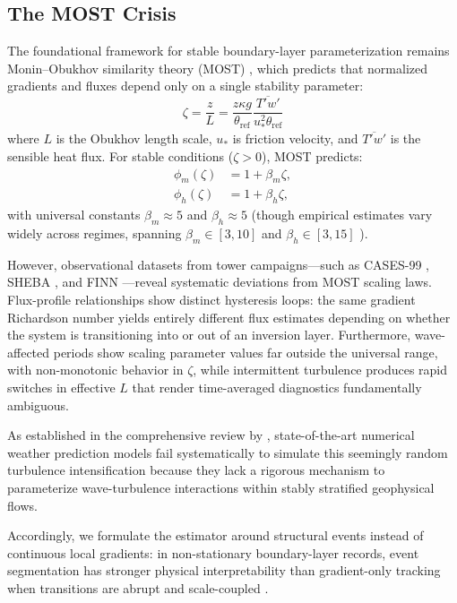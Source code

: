 \subsection{The MOST Crisis}

The foundational framework for stable boundary-layer parameterization remains Monin--Obukhov similarity theory (MOST) \citep{Obukhov1946, Paulson1970}, which predicts that normalized gradients and fluxes depend only on a single stability parameter:
\begin{equation}
\zeta = \frac{z}{L} = \frac{z \kappa g}{\theta_{\mathrm{ref}}} \frac{\overline{T'w'}}{u_*^2 \theta_{\mathrm{ref}}}
\label{eq:zeta}
\end{equation}
where $L$ is the Obukhov length scale, $u_*$ is friction velocity, and $\overline{T'w'}$ is the sensible heat flux. For stable conditions ($\zeta > 0$), MOST predicts:
\begin{equation}
\begin{aligned}
\phi_m(\zeta) &= 1 + \beta_m\zeta, \\
\phi_h(\zeta) &= 1 + \beta_h\zeta,
\end{aligned}
\end{equation}
with universal constants $\beta_m \approx 5$ and $\beta_h \approx 5$ (though empirical estimates vary widely across regimes, spanning $\beta_m \in [3, 10]$ and $\beta_h \in [3, 15]$ \citep{Dyer1974, Högström1988}).

However, observational datasets from tower campaigns---such as CASES-99 \citep{Poulos2002}, SHEBA \citep{Uttal2002}, and FINN \citep{Mahrt2013}---reveal systematic deviations from MOST scaling laws. Flux-profile relationships show distinct hysteresis loops: the same gradient Richardson number yields entirely different flux estimates depending on whether the system is transitioning into or out of an inversion layer. Furthermore, wave-affected periods show scaling parameter values far outside the universal range, with non-monotonic behavior in $\zeta$, while intermittent turbulence produces rapid switches in effective $L$ that render time-averaged diagnostics fundamentally ambiguous.

As established in the comprehensive review by \citet{Sun2015}, state-of-the-art numerical weather prediction models fail systematically to simulate this seemingly random turbulence intensification because they lack a rigorous mechanism to parameterize wave-turbulence interactions within stably stratified geophysical flows.

Accordingly, we formulate the estimator around structural events instead of continuous local gradients: in non-stationary boundary-layer records, event segmentation has stronger physical interpretability than gradient-only tracking when transitions are abrupt and scale-coupled \citep{Kang2014a, Narasimha1995}.

